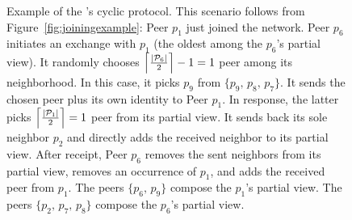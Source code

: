 \begin{figure}
  \centering
  
  \caption{\label{fig:cyclicexample}Example of the \SCAMPLON{}'s cyclic
    protocol. This scenario follows from Figure~\ref{fig:joiningexample}: Peer
    $p_1$ just joined the network. Peer $p_6$ initiates an exchange with $p_1$
    (the oldest among the $p_6$'s partial view). It randomly chooses
    $\left\lceil{|\mathcal{P}_6|\over{2}}\right\rceil-1 = 1$ peer among its
    neighborhood. In this case, it picks $p_9$ from $\{p_9,\,p_8,\,p_7\}$.  It
    sends the chosen peer plus its own identity to Peer $p_1$. In response, the
    latter picks $\left\lceil{|\mathcal{P}_1|\over{2}}\right\rceil = 1$ peer
    from its partial view. It sends back its sole neighbor $p_2$ and directly
    adds the received neighbor to its partial view. After receipt, Peer $p_6$
    removes the sent neighbors from its partial view, removes an occurrence of
    $p_1$, and adds the received peer from $p_1$. The peers $\{p_6,\,p_9\}$
    compose the $p_1$'s partial view. The peers $\{p_2,\,p_7,\,p_8\}$ compose
    the $p_6$'s partial view.}
\end{figure}


